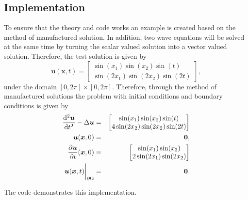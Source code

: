 \subsection{Implementation}
To ensure that the theory and code works an example is created based on the method of manufactured solution. In addition, two wave equations will be solved at the same time by turning the scalar valued solution into a vector valued solution. Therefore, the test solution is given by
\begin{equation}
  \bm{u}(\bm{x},t) =
  \begin{bmatrix}
    \sin(x_1)\sin(x_2)\sin(t) \\
    \sin(2x_1)\sin(2x_2)\sin(2t)
  \end{bmatrix},
\end{equation}
under the domain $[0,2\pi]\times[0,2\pi]$. Therefore, through the method of manufactured solutions the problem with initial conditions and boundary conditions is given by
\begin{eqnarray*}
  \frac{\mathop{}\!\mathrm{d}^2\bm{u}}{\mathop{}\!\mathrm{d} t^2} - \Delta \bm{u} & = &
  \begin{bmatrix}
    \sin(x_1)\sin(x_2)\sin(t) \\
    4\sin(2x_2)\sin(2x_2)\sin(2t)
  \end{bmatrix} \\
  \bm{u}(\bm{x},0) & = & \bm{0}, \\
  \frac{\partial \bm{u}}{\partial t}(\bm{x},0) & = &
  \begin{bmatrix}
    \sin(x_1)\sin(x_2) \\
    2\sin(2x_1)\sin(2x_2)
  \end{bmatrix} \\
  \bm{u}(\bm{x},t)\bigg|_{\partial\Omega} & = & \bm{0}.
\end{eqnarray*}

The code demonstrates this implementation.
